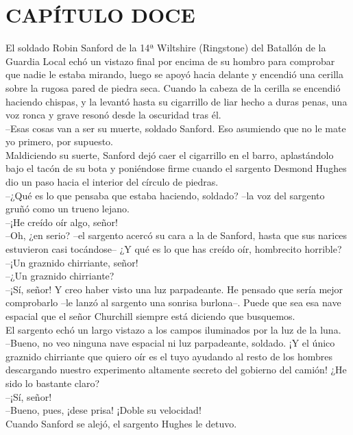 \chapter*{CAPÍTULO DOCE}
El soldado Robin Sanford de la 14ª Wiltshire (Ringstone) del Batallón de
la Guardia Local echó un vistazo final por encima de su hombro para
comprobar que nadie le estaba mirando, luego se apoyó hacia delante y
encendió una cerilla sobre la rugosa pared de piedra seca. Cuando la
cabeza de la cerilla se encendió haciendo chispas, y la levantó hasta su
cigarrillo de liar hecho a duras penas, una voz ronca y grave resonó
desde la oscuridad tras él.\\
--Esas cosas van a ser su muerte, soldado Sanford. Eso asumiendo que no
le mate yo primero, por supuesto.\\
Maldiciendo su suerte, Sanford dejó caer el cigarrillo en el barro,
aplastándolo bajo el tacón de su bota y poniéndose firme cuando el
sargento Desmond Hughes dio un paso hacia el interior del círculo de
piedras.\\
--¿Qué es lo que pensaba que estaba haciendo, soldado? --la voz del
sargento gruñó como un trueno lejano.\\
--¡He creído oír algo, señor!\\
--Oh, ¿en serio? --el sargento acercó su cara a la de Sanford, hasta que
sus narices estuvieron casi tocándose-- ¿Y qué es lo que has creído oír,
hombrecito horrible?\\
--¡Un graznido chirriante, señor!\\
--¿Un graznido chirriante?\\
--¡Sí, señor! Y creo haber visto una luz parpadeante. He pensado que
sería mejor comprobarlo --le lanzó al sargento una sonrisa burlona--.
Puede que sea esa nave espacial que el señor Churchill siempre está
diciendo que busquemos.\\
El sargento echó un largo vistazo a los campos iluminados por la luz de
la luna.\\
--Bueno, no veo ninguna nave espacial ni luz parpadeante, soldado. ¡Y el
único graznido chirriante que quiero oír es el tuyo ayudando al resto de
los hombres descargando nuestro experimento altamente secreto del
gobierno del camión! ¿He sido lo bastante claro?\\
--¡Sí, señor!\\
--Bueno, pues, ¡dese prisa! ¡Doble su velocidad!\\
Cuando Sanford se alejó, el sargento Hughes le detuvo.\\
